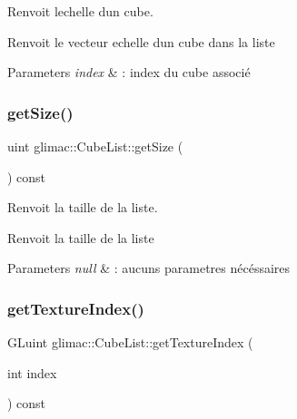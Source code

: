 Renvoit l\textquotesingle{}echelle d\textquotesingle{}un cube. 

Renvoit le vecteur echelle d\textquotesingle{}un cube dans la liste


\begin{DoxyParams}{Parameters}
{\em index} & \+: index du cube associé \\
\hline
\end{DoxyParams}
\mbox{\label{classglimac_1_1CubeList_a9b51810627d160c29da5c319824c4cc7}} 
\subsubsection{\texorpdfstring{get\+Size()}{getSize()}}
{\footnotesize\ttfamily uint glimac\+::\+Cube\+List\+::get\+Size (\begin{DoxyParamCaption}{ }\end{DoxyParamCaption}) const\hspace{0.3cm}{\ttfamily [inline]}}



Renvoit la taille de la liste. 

Renvoit la taille de la liste


\begin{DoxyParams}{Parameters}
{\em null} & \+: aucuns parametres nécéssaires \\
\hline
\end{DoxyParams}
\mbox{\label{classglimac_1_1CubeList_a28de6776acfb7c76425c145e0b92c55f}} 
\subsubsection{\texorpdfstring{get\+Texture\+Index()}{getTextureIndex()}}
{\footnotesize\ttfamily G\+Luint glimac\+::\+Cube\+List\+::get\+Texture\+Index (\begin{DoxyParamCaption}\item[{int}]{index }\end{DoxyParamCaption}) const\hspace{0.3cm}{\ttfamily [inline]}}



